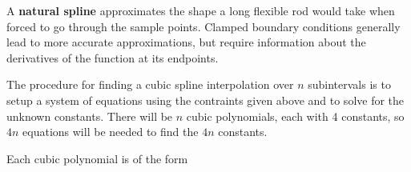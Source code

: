 \documentclass{article}
\begin{document}
A \textbf{natural spline} approximates the shape a long flexible rod would take when forced to go through the sample points. Clamped boundary conditions generally lead to more accurate approximations, but require information about the derivatives of the function at its endpoints.

The procedure for finding a cubic spline interpolation over $n$ subintervals is to setup a system of equations using the contraints given above and to solve for the unknown constants. There will be $n$ cubic polynomials, each with 4 constants, so $4n$ equations will be needed to find the $4n$ constants.

Each cubic polynomial is of the form
\end{document}
